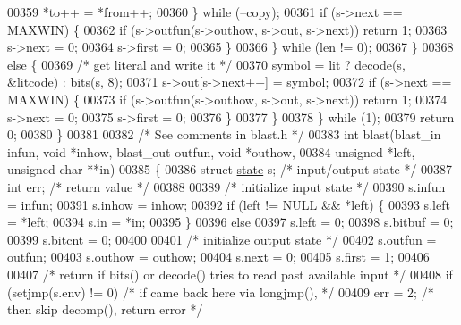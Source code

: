 \begin{DoxyCode}
00359                     *to++ = *from++;
00360                 \} \textcolor{keywordflow}{while} (--copy);
00361                 \textcolor{keywordflow}{if} (s->next == MAXWIN) \{
00362                     \textcolor{keywordflow}{if} (s->outfun(s->outhow, s->out, s->next)) \textcolor{keywordflow}{return} 1;
00363                     s->next = 0;
00364                     s->first = 0;
00365                 \}
00366             \} \textcolor{keywordflow}{while} (len != 0);
00367         \}
00368         \textcolor{keywordflow}{else} \{
00369             \textcolor{comment}{/* get literal and write it */}
00370             symbol = lit ? decode(s, &litcode) : bits(s, 8);
00371             s->out[s->next++] = symbol;
00372             \textcolor{keywordflow}{if} (s->next == MAXWIN) \{
00373                 \textcolor{keywordflow}{if} (s->outfun(s->outhow, s->out, s->next)) \textcolor{keywordflow}{return} 1;
00374                 s->next = 0;
00375                 s->first = 0;
00376             \}
00377         \}
00378     \} \textcolor{keywordflow}{while} (1);
00379     \textcolor{keywordflow}{return} 0;
00380 \}
00381 
00382 \textcolor{comment}{/* See comments in blast.h */}
00383 \textcolor{keywordtype}{int} blast(blast\_in infun, \textcolor{keywordtype}{void} *inhow, blast\_out outfun, \textcolor{keywordtype}{void} *outhow,
00384           \textcolor{keywordtype}{unsigned} *left, \textcolor{keywordtype}{unsigned} \textcolor{keywordtype}{char} **in)
00385 \{
00386     \textcolor{keyword}{struct }\hyperlink{structstate}{state} s;             \textcolor{comment}{/* input/output state */}
00387     \textcolor{keywordtype}{int} err;                    \textcolor{comment}{/* return value */}
00388 
00389     \textcolor{comment}{/* initialize input state */}
00390     s.infun = infun;
00391     s.inhow = inhow;
00392     \textcolor{keywordflow}{if} (left != NULL && *left) \{
00393         s.left = *left;
00394         s.in = *in;
00395     \}
00396     \textcolor{keywordflow}{else}
00397         s.left = 0;
00398     s.bitbuf = 0;
00399     s.bitcnt = 0;
00400 
00401     \textcolor{comment}{/* initialize output state */}
00402     s.outfun = outfun;
00403     s.outhow = outhow;
00404     s.next = 0;
00405     s.first = 1;
00406 
00407     \textcolor{comment}{/* return if bits() or decode() tries to read past available input */}
00408     \textcolor{keywordflow}{if} (setjmp(s.env) != 0)             \textcolor{comment}{/* if came back here via longjmp(), */}
00409         err = 2;                        \textcolor{comment}{/*  then skip decomp(), return error */}

\end{DoxyCode}
